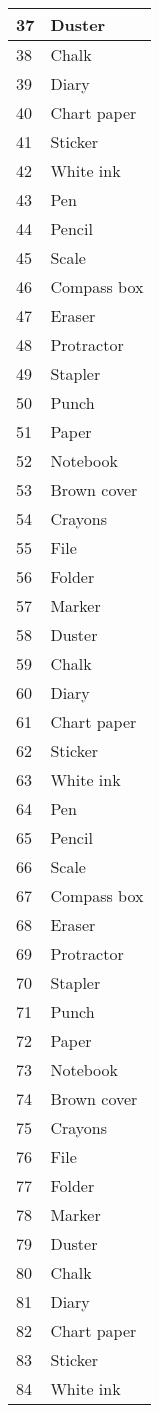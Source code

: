 \documentclass{article}
\begin{document}
\begin{longtable}{|l|l|}
		\hline
		37 & Duster\\
		\hline
		38 & Chalk\\
		\hline
		39 & Diary\\
		\hline
		40 & Chart paper\\
		\hline
		41 & Sticker\\
		\hline
		42 & White ink\\
		\hline
		43 & Pen\\
		\hline
		44 & Pencil\\
		\hline
		45 & Scale\\
		\hline
		46 & Compass box\\
		\hline
		47 & Eraser\\
		\hline
		48 & Protractor\\
		\hline
		49 & Stapler\\
		\hline
		50 & Punch\\
		\hline
		51 & Paper\\
		\hline
		52 & Notebook\\
		\hline
		53 & Brown cover\\
		\hline
		54 & Crayons\\
		\hline
		55 & File\\
		\hline
		56 & Folder\\
		\hline
		57 & Marker\\
		\hline
		58 & Duster\\
		\hline
		59 & Chalk\\
		\hline
		60 & Diary\\
		\hline
		61 & Chart paper\\
		\hline
		62 & Sticker\\
		\hline
		63 & White ink\\
		\hline
		64 & Pen\\
		\hline
		65 & Pencil\\
		\hline
		66 & Scale\\
		\hline
		67 & Compass box\\
		\hline
		68 & Eraser\\
		\hline
		69 & Protractor\\
		\hline
		70 & Stapler\\
		\hline
		71 & Punch\\
		\hline
		72 & Paper\\
		\hline
		73 & Notebook\\
		\hline
		74 & Brown cover\\
		\hline
		75 & Crayons\\
		\hline
		76 & File\\
		\hline
		77 & Folder\\
		\hline
		78 & Marker\\
		\hline
		79 & Duster\\
		\hline
		80 & Chalk\\
		\hline
		81 & Diary\\
		\hline
		82 & Chart paper\\
		\hline
		83 & Sticker\\
		\hline
		84 & White ink\\
		\hline
	\end{longtable}
\end{document}
